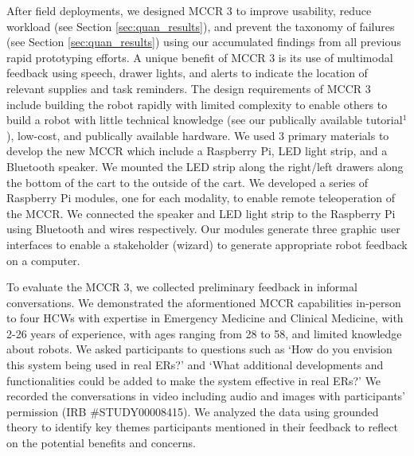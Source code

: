 After field deployments, we designed MCCR 3 to improve usability, reduce workload (see Section \ref{sec:quan_results}), and prevent the taxonomy of failures (see Section \ref{sec:quan_results}) using our accumulated findings from all previous rapid prototyping efforts.%
A unique benefit of MCCR 3 is its use of multimodal feedback using speech, drawer lights, and alerts to indicate the location of relevant supplies and task reminders.
The design requirements of MCCR 3 include building the robot rapidly with limited complexity to enable others to build a robot with little technical knowledge (see our publically available tutorial$^1$), low-cost, and publically available hardware.
We used 3 primary materials to develop the new MCCR which include a Raspberry Pi, LED light strip, and a  Bluetooth speaker.
We mounted the LED strip along the right/left drawers along the bottom of the cart to the outside of the cart.
We developed a series of Raspberry Pi modules, one for each modality, to enable remote teleoperation of the MCCR.
We connected the speaker and LED light strip to the Raspberry Pi using Bluetooth and wires respectively.
Our modules generate three graphic user interfaces to enable a stakeholder (wizard) to generate appropriate robot feedback on a computer.


To evaluate the MCCR 3, we collected preliminary feedback in informal conversations.
We demonstrated the aformentioned MCCR capabilities in-person to four HCWs with expertise in Emergency Medicine and Clinical Medicine, with 2-26 years of experience, with ages ranging from 28 to 58, and limited knowledge about robots. %
We asked participants to questions such as `How do you envision this system being used in real ERs?’ and `What additional developments and functionalities could be added to make the system effective in real ERs?’
We recorded the conversations in video including audio and images with participants' permission (IRB \#STUDY00008415).
We analyzed the data using grounded theory to identify key themes participants mentioned in their feedback to reflect on the potential benefits and concerns.


